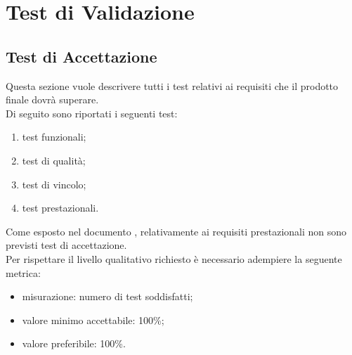 \section{Test di Validazione}

\subsection{Test di Accettazione}
	Questa sezione vuole descrivere tutti i test relativi ai requisiti che il prodotto finale dovrà superare.\\
	Di seguito sono riportati i seguenti test:
	\begin{enumerate}
		\item test funzionali;
		\item test di qualità;
		\item test di vincolo;
		\item test prestazionali.
	\end{enumerate}
	Come esposto nel documento \AdR{}, relativamente ai requisiti prestazionali non sono previsti test di accettazione. \\
	Per rispettare il livello qualitativo richiesto è necessario adempiere la seguente metrica:
	\begin{itemize}
		\item{misurazione: numero di test soddisfatti;}
		\item{valore minimo accettabile: 100\%;}
		\item{valore preferibile: 100\%.}
	\end{itemize}
	
	
	
	\pagebreak
	